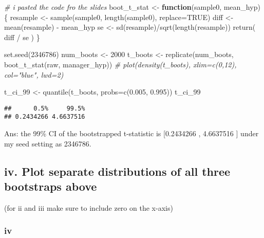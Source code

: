 \documentclass[
]{article}
\newenvironment{Shaded}{\begin{snugshade}}{\end{snugshade}}
\newcommand{\AttributeTok}[1]{\textcolor[rgb]{0.77,0.63,0.00}{#1}}
\newcommand{\CommentTok}[1]{\textcolor[rgb]{0.56,0.35,0.01}{\textit{#1}}}
\newcommand{\ConstantTok}[1]{\textcolor[rgb]{0.00,0.00,0.00}{#1}}
\newcommand{\ControlFlowTok}[1]{\textcolor[rgb]{0.13,0.29,0.53}{\textbf{#1}}}
\newcommand{\DecValTok}[1]{\textcolor[rgb]{0.00,0.00,0.81}{#1}}
\newcommand{\FloatTok}[1]{\textcolor[rgb]{0.00,0.00,0.81}{#1}}
\newcommand{\FunctionTok}[1]{\textcolor[rgb]{0.00,0.00,0.00}{#1}}
\newcommand{\NormalTok}[1]{#1}
\newcommand{\OtherTok}[1]{\textcolor[rgb]{0.56,0.35,0.01}{#1}}
\newcommand{\SpecialCharTok}[1]{\textcolor[rgb]{0.00,0.00,0.00}{#1}}
\begin{document}
\begin{Shaded}
\begin{Highlighting}[]
\CommentTok{\# i pasted the code fro the slides}
\NormalTok{boot\_t\_stat }\OtherTok{\textless{}{-}} \ControlFlowTok{function}\NormalTok{(sample0, mean\_hyp) \{}
\NormalTok{resample }\OtherTok{\textless{}{-}} \FunctionTok{sample}\NormalTok{(sample0, }\FunctionTok{length}\NormalTok{(sample0), }\AttributeTok{replace=}\ConstantTok{TRUE}\NormalTok{)}
\NormalTok{diff }\OtherTok{\textless{}{-}} \FunctionTok{mean}\NormalTok{(resample) }\SpecialCharTok{{-}}\NormalTok{ mean\_hyp}
\NormalTok{se }\OtherTok{\textless{}{-}} \FunctionTok{sd}\NormalTok{(resample)}\SpecialCharTok{/}\FunctionTok{sqrt}\NormalTok{(}\FunctionTok{length}\NormalTok{(resample))}
\FunctionTok{return}\NormalTok{( diff }\SpecialCharTok{/}\NormalTok{ se )}
\NormalTok{\}}

\FunctionTok{set.seed}\NormalTok{(}\DecValTok{2346786}\NormalTok{)}
\NormalTok{num\_boots }\OtherTok{\textless{}{-}} \DecValTok{2000}
\NormalTok{t\_boots }\OtherTok{\textless{}{-}} \FunctionTok{replicate}\NormalTok{(num\_boots, }\FunctionTok{boot\_t\_stat}\NormalTok{(raw, manager\_hyp))}
\CommentTok{\# plot(density(t\_boots), xlim=c(0,12), col="blue", lwd=2)}

\NormalTok{t\_ci\_99 }\OtherTok{\textless{}{-}} \FunctionTok{quantile}\NormalTok{(t\_boots, }\AttributeTok{probs=}\FunctionTok{c}\NormalTok{(}\FloatTok{0.005}\NormalTok{, }\FloatTok{0.995}\NormalTok{))}
\NormalTok{t\_ci\_99}
\end{Highlighting}
\end{Shaded}

\begin{verbatim}
##      0.5%     99.5% 
## 0.2434266 4.6637516
\end{verbatim}

Ans: the 99\% CI of the bootstrapped t-statistic is {[}0.2434266 ,
4.6637516 {]} under my seed setting as 2346786.

\hypertarget{iv.-plot-separate-distributions-of-all-three-bootstraps-above}{%
\subsection{iv. Plot separate distributions of all three bootstraps
above}\label{iv.-plot-separate-distributions-of-all-three-bootstraps-above}}

(for ii and iii make sure to include zero on the x-axis)

\hypertarget{iv}{%
\subsubsection{iv}\label{iv}}
\end{document}
